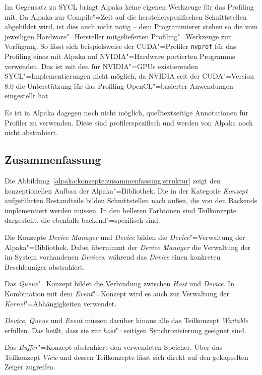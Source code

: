 Im Gegensatz zu SYCL bringt Alpaka keine eigenen Werkzeuge für das Profiling
mit. Da Alpaka zur Compile"=Zeit auf die herstellerspezifischen Schnittstellen
abgebildet wird, ist dies auch nicht nötig -- dem Programmierer stehen so die
vom jeweiligen Hardware"=Hersteller mitgelieferten Profiling"=Werkzeuge zur
Verfügung. So lässt sich beispielsweise der CUDA"=Profiler \texttt{nvprof} für
das Profiling eines mit Alpaka auf NVIDIA"=Hardware portierten Programms
verwenden. Das ist mit den für NVIDIA"=GPUs existierenden
SYCL"=Implementierungen nicht möglich, da NVIDIA seit der CUDA"=Version 8.0 die
Unterstützung für das Profiling OpenCL"=basierter Anwendungen eingestellt hat.

Es ist in Alpaka dagegen noch nicht möglich, quelltextseitige Annotationen für
Profiler zu verwenden. Diese sind profilerspezifisch und werden von Alpaka noch
nicht abstrahiert.

\subsection{Zusammenfassung}

Die Abbildung~\ref{alpaka:konzepte:zusammenfassung:struktur} zeigt den
konzeptionellen Aufbau der Alpaka"=Bibliothek. Die in der Kategorie
\textit{Konzept} aufgeführten Bestandteile bilden Schnittstellen nach außen, die
von den Backends implementiert werden müssen. In den helleren Farbtönen sind
Teilkonzepte dargestellt, die ebenfalls backend"=spezifisch sind.

Die Konzepte \textit{Device Manager} und \textit{Device} bilden die
\textit{Device}"=Verwaltung der Alpaka"=Bibliothek. Dabei übernimmt der
\textit{Device Manager} die Verwaltung der im System vorhandenen
\textit{Devices}, während das \textit{Device} einen konkreten Beschleuniger
abstrahiert.

Das \textit{Queue}"=Konzept bildet die Verbindung zwischen \textit{Host} und
\textit{Device}. In Kombination mit dem \textit{Event}"=Konzept wird es auch
zur Verwaltung der \textit{Kernel}"=Abhängigkeiten verwendet.

\textit{Device}, \textit{Queue} und \textit{Event} müssen darüber hinaus alle
das Teilkonzept \textit{Waitable} erfüllen. Das heißt, dass sie zur
\textit{host}"=seitigen Synchronisierung geeignet sind.

Das \textit{Buffer}"=Konzept abstrahiert den verwendeten Speicher. Über das
Teilkonzept \textit{View} und dessen Teilkonzepte lässt sich direkt auf den
gekapselten Zeiger zugreifen.


